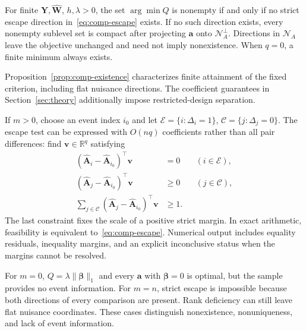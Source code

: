 \begin{proposition}
\label{prop:comp-existence}
For finite $\bm Y,\widehat{\bm{W}}$, $h,\lambda>0$, the set $\arg\min Q$ is nonempty if and only if no strict escape direction in~\eqref{eq:comp-escape} exists. If no such direction exists, every nonempty sublevel set is compact after projecting $\bm{a}$ onto $\mathcal N_A^\perp$. Directions in $\mathcal N_A$ leave the objective unchanged and need not imply nonexistence. When $q=0$, a finite minimum always exists.
\end{proposition}
Proposition~\ref{prop:comp-existence} characterizes finite attainment of the fixed criterion, including flat nuisance directions. The coefficient guarantees in Section~\ref{sec:theory} additionally impose restricted-design separation.

If $m>0$, choose an event index $i_0$ and let $\mathcal E=\{i:\Delta_i=1\}$, $\mathcal C=\{j:\Delta_j=0\}$. The escape test can be expressed with $O(nq)$ coefficients rather than all pair differences: find $\bm{v}\in\mathbb R^q$ satisfying
\begin{equation}
 \begin{aligned}
 (\widehat{\bm{A}}_i-\widehat{\bm{A}}_{i_0})^\top \bm{v}&=0&& (i\in\mathcal E),\\
 (\widehat{\bm{A}}_j-\widehat{\bm{A}}_{i_0})^\top \bm{v}&\ge0&& (j\in\mathcal C),\\
 \sum_{j\in\mathcal C}(\widehat{\bm{A}}_j-\widehat{\bm{A}}_{i_0})^\top \bm{v}&\ge1.&
 \end{aligned}
 \label{eq:comp-escape-lp}
\end{equation}
The last constraint fixes the scale of a positive strict margin. In exact arithmetic, feasibility is equivalent to~\eqref{eq:comp-escape}. Numerical output includes equality residuals, inequality margins, and an explicit inconclusive status when the margins cannot be resolved.

For $m=0$, $Q=\lambda\|\bm{\beta}\|_1$ and every $\bm{a}$ with $\bm{\beta}=0$ is optimal, but the sample provides no event information. For $m=n$, strict escape is impossible because both directions of every comparison are present. Rank deficiency can still leave flat nuisance coordinates. These cases distinguish nonexistence, nonuniqueness, and lack of event information.

